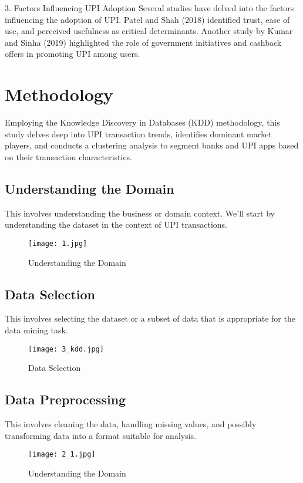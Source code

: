 \documentclass[12pt]{article}
\begin{document}
3. Factors Influencing UPI Adoption
Several studies have delved into the factors influencing the adoption of UPI. Patel and Shah (2018) identified trust, ease of use, and perceived usefulness as critical determinants. Another study by Kumar and Sinha (2019) highlighted the role of government initiatives and cashback offers in promoting UPI among users.

\section{Methodology}

Employing the Knowledge Discovery in Databases (KDD) methodology, this study delves deep into UPI transaction trends, identifies dominant market players, and conducts a clustering analysis to segment banks and UPI apps based on their transaction characteristics.

\subsection{Understanding the Domain}
This involves understanding the business or domain context. We'll start by understanding the dataset in the context of UPI transactions.

\begin{figure}[H]
    \centering
    \texttt{[image: 1.jpg]}
    \caption{Understanding the Domain}
\end{figure}

\subsection{Data Selection}
This involves selecting the dataset or a subset of data that is appropriate for the data mining task.

\begin{figure}[H]
    \centering
    \texttt{[image: 3\_kdd.jpg]}
    \caption{Data Selection}
\end{figure}

\subsection{Data Preprocessing}
This involves cleaning the data, handling missing values, and possibly transforming data into a format suitable for analysis.

\begin{figure}[H]
    \centering
    \texttt{[image: 2\_1.jpg]}
    \caption{Understanding the Domain}
\end{figure}
\end{document}
